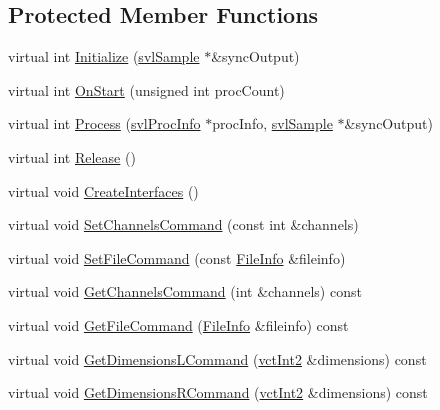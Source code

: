 \subsection*{Protected Member Functions}
\begin{DoxyCompactItemize}
\item 
virtual int \hyperlink{classsvl_filter_source_image_file_a68e9c26e989e81754020510d247a2438}{Initialize} (\hyperlink{classsvl_sample}{svl\-Sample} $\ast$\&sync\-Output)
\item 
virtual int \hyperlink{classsvl_filter_source_image_file_ade1a6e0aa1f595bfdaead9e300e9b4c7}{On\-Start} (unsigned int proc\-Count)
\item 
virtual int \hyperlink{classsvl_filter_source_image_file_ad0ce8bdd63a6ac12a0af408fc6570d29}{Process} (\hyperlink{structsvl_proc_info}{svl\-Proc\-Info} $\ast$proc\-Info, \hyperlink{classsvl_sample}{svl\-Sample} $\ast$\&sync\-Output)
\item 
virtual int \hyperlink{classsvl_filter_source_image_file_ac308b049ec61edf88ec775e324ffb7b0}{Release} ()
\item 
virtual void \hyperlink{classsvl_filter_source_image_file_acf8b49f04aad025c610f70ee310761e0}{Create\-Interfaces} ()
\item 
virtual void \hyperlink{classsvl_filter_source_image_file_a048a691c74bc136f4a5ef74c772c1274}{Set\-Channels\-Command} (const int \&channels)
\item 
virtual void \hyperlink{classsvl_filter_source_image_file_a8af078d145fb198b98663a5826f84bc9}{Set\-File\-Command} (const \hyperlink{classsvl_filter_source_image_file_a0acade731f76b2a1adc5a6a43417c4f4}{File\-Info} \&fileinfo)
\item 
virtual void \hyperlink{classsvl_filter_source_image_file_a49726860e3580b2a6fc341a1d09d0c03}{Get\-Channels\-Command} (int \&channels) const 
\item 
virtual void \hyperlink{classsvl_filter_source_image_file_a1c7995d00bffc2c57fe2179fabc98b6e}{Get\-File\-Command} (\hyperlink{classsvl_filter_source_image_file_a0acade731f76b2a1adc5a6a43417c4f4}{File\-Info} \&fileinfo) const 
\item 
virtual void \hyperlink{classsvl_filter_source_image_file_a2f79506c73cd1aa2cbf85c8a74f84402}{Get\-Dimensions\-L\-Command} (\hyperlink{vct_fixed_size_vector_types_8h_add8c88eb6a432b15f14b866b9c35325f}{vct\-Int2} \&dimensions) const 
\item 
virtual void \hyperlink{classsvl_filter_source_image_file_a060f53401080afa2882e8c33cd9faba3}{Get\-Dimensions\-R\-Command} (\hyperlink{vct_fixed_size_vector_types_8h_add8c88eb6a432b15f14b866b9c35325f}{vct\-Int2} \&dimensions) const 
\end{DoxyCompactItemize}
